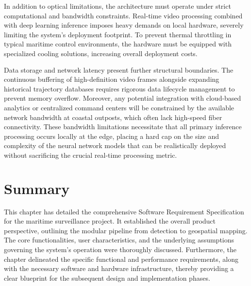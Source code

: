 In addition to optical limitations, the architecture must operate under strict computational and bandwidth constraints. Real-time video processing combined with deep learning inference imposes heavy demands on local hardware, severely limiting the system's deployment footprint. To prevent thermal throttling in typical maritime control environments, the hardware must be equipped with specialized cooling solutions, increasing overall deployment costs.

Data storage and network latency present further structural boundaries. The continuous buffering of high-definition video frames alongside expanding historical trajectory databases requires rigorous data lifecycle management to prevent memory overflow. Moreover, any potential integration with cloud-based analytics or centralized command centers will be constrained by the available network bandwidth at coastal outposts, which often lack high-speed fiber connectivity. These bandwidth limitations necessitate that all primary inference processing occurs locally at the edge, placing a hard cap on the size and complexity of the neural network models that can be realistically deployed without sacrificing the crucial real-time processing metric.

\section{Summary}
This chapter has detailed the comprehensive Software Requirement Specification for the maritime surveillance project. It established the overall product perspective, outlining the modular pipeline from detection to geospatial mapping. The core functionalities, user characteristics, and the underlying assumptions governing the system's operation were thoroughly discussed. Furthermore, the chapter delineated the specific functional and performance requirements, along with the necessary software and hardware infrastructure, thereby providing a clear blueprint for the subsequent design and implementation phases.
